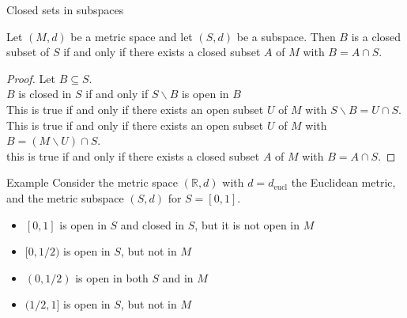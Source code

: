 \documentclass{beamer}
\begin{document}
\begin{frame}{Closed sets in subspaces}
\begin{thm}
Let $(M,d)$ be a metric space and let $(S,d)$ be a subspace.
Then $B$ is a closed subset of $S$ if and only if there exists a closed subset $A$ of $M$ with $B = A\cap S$.
\end{thm}
\pause
\begin{proof}
\pause
Let $B\subseteq S$.\\
\pause
$B$ is closed in $S$ if and only if $S\backslash B$ is open in $B$\\
\pause
This is true if and only if there exists an open subset $U$ of $M$ with $S\backslash B = U\cap S$.\\
\pause
This is true if and only if there exists an open subset $U$ of $M$ with $B = (M\backslash U)\cap S$.\\
\pause
this is true if and only if there exists a closed subset $A$ of $M$ with $B = A\cap S$.
\end{proof}
\end{frame}

\begin{frame}{Example}
Consider the metric space $(\mathbb{R},d)$ with $d = d_{\text{eucl}}$ the Euclidean metric, and the metric subspace $(S,d)$ for $S = [0,1]$.
\begin{itemize}
\pause
\item $[0,1]$ is open in $S$ and closed in $S$, but it is not open in $M$
\pause
\item $[0,1/2)$ is open in $S$, but not in $M$
\pause
\item $(0,1/2)$ is open in both $S$ and in $M$
\pause
\item $(1/2,1]$ is open in $S$, but not in $M$
\end{itemize}
\end{frame}
\end{document}
